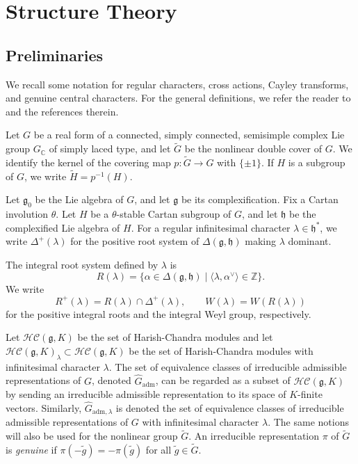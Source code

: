 \documentclass{amsart}
\newcommand{\cal}{\mathcal}
\newcommand{\fk}{\mathfrak}
\newcommand{\adm}{\mathrm{adm}}
\theoremstyle{definition}
\newcommand{\tu}{\widetilde}
\begin{document}
 


\section{Structure Theory}

\subsection{Preliminaries}

We recall some notation for regular characters, cross actions, Cayley transforms, and genuine central characters. For the general definitions, we refer the reader to \cite[Section 2]{Ts23} and the references therein.

Let $G$ be a real form of a connected, simply connected, semisimple complex Lie group $G_{\mathbb C}$ of simply laced type, and let $\widetilde G$ be the nonlinear double cover of $G$. We identify the kernel of the covering map $p:\widetilde G\to G$ with $\{\pm 1\}$. If $H$ is a subgroup of $G$, we write $\widetilde H=p^{-1}(H)$.

Let $\mathfrak g_0$ be the Lie algebra of $G$, and let $\mathfrak g$ be its complexification. Fix a Cartan involution $\theta$. Let $H$ be a $\theta$-stable Cartan subgroup of $G$, and let $\mathfrak h$ be the complexified Lie algebra of $H$. For a regular infinitesimal character $\lambda\in \mathfrak h^*$, we write $\Delta^+(\lambda)$ for the positive root system of $\Delta(\mathfrak g,\mathfrak h)$ making $\lambda$ dominant.

The integral root system defined by $\lambda$ is
\begin{equation*}
R(\lambda)=\{\alpha\in\Delta(\mathfrak g,\mathfrak h)\mid
\langle \lambda,\alpha^\vee\rangle\in\mathbb Z\}.
\end{equation*}
We write
\begin{equation*}
R^+(\lambda)=R(\lambda)\cap \Delta^+(\lambda),
\qquad
W(\lambda)=W(R(\lambda))
\end{equation*}
for the positive integral roots and the integral Weyl group, respectively.
\medskip

Let $\mathcal{HC}(\fk g, K)$ be the set of Harish-Chandra modules and let  $\cal{HC}(\fk g, K)_\lambda \subset \cal{HC}(\fk g, K)$ be the set of Harish-Chandra modules 
with infinitesimal character $\lambda$.  The set of equivalence classes of irreducible admissible representations of $G$, denoted $\widehat G _{\adm}$, can be regarded as 
a subset of $\cal{HC}(\fk g, K)$ by sending an irreducible admissible representation to its space of $K$-finite vectors. Similarly, $\widehat G_{\adm,\lambda}$ is denoted the set 
of  equivalence classes of irreducible admissible representations of $G$ with infinitesimal character $\lambda$.  The same notions will also be used for the nonlinear group $\tu G$. An
irreducible representation $\pi$ of $\tu G$ is \emph{genuine} if $\pi(-\tu g)=-\pi(\tu g)$ for all $\tu g\in \tu G$.
\end{document}
